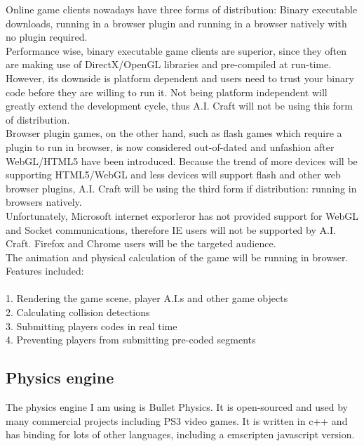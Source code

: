 \documentclass[12pt]{article}
\begin{document}
Online game clients nowadays have three forms of distribution: Binary executable downloads, running in a browser plugin and running in a browser natively with no plugin required.\\ 

Performance wise, binary executable game clients are superior, since they often are making use of DirectX/OpenGL libraries and pre-compiled at run-time. However, its downside is platform dependent and users need to trust your binary code before they are willing to run it. Not being platform independent will greatly extend the development cycle, thus A.I. Craft will not be using this form of distribution.\\ 

Browser plugin games, on the other hand, such as flash games which require a plugin to run in browser, is now considered out-of-dated and unfashion after WebGL/HTML5 have been introduced. Because the trend of more devices will be supporting HTML5/WebGL and less devices will support flash and other web browser plugins, A.I. Craft will be using the third form if distribution: running in browsers natively.\\ 

Unfortunately, Microsoft internet exporleror has not provided support for WebGL and Socket communications, therefore IE users will not be supported by A.I. Craft. Firefox and Chrome users will be the targeted audience.\\


The animation and physical calculation of the game will be running in browser. Features included:\\
\\
1. Rendering the game scene, player A.I.s and other game objects\\
2. Calculating collision detections\\
3. Submitting players codes in real time\\
4. Preventing players from submitting pre-coded segments\\

{\color{red}
\subsection{Physics engine}
The physics engine I am using is Bullet Physics. It is open-sourced and used by many commercial projects including PS3 video games. It is written in c++ and has binding for lots of other languages, including a emscripten javascript version. 
}
\end{document}
